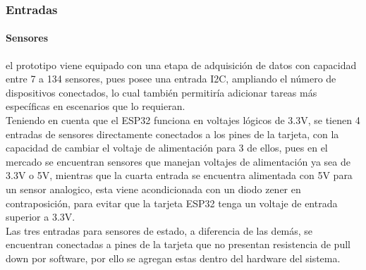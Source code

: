 	
	\subsubsection{Entradas}
	\paragraph{Sensores}
		el prototipo viene equipado con una etapa de adquisición de datos con capacidad entre 7 a 134 sensores, pues posee una entrada I2C, ampliando el número de dispositivos conectados, lo cual también permitiría adicionar tareas más específicas en escenarios que lo requieran.\\
		
	 	Teniendo en cuenta que el ESP32 funciona en voltajes lógicos de 3.3V, se tienen 4 entradas de sensores directamente conectados a los pines de la tarjeta, con la capacidad de cambiar el voltaje de alimentación para 3 de ellos, pues en el mercado se encuentran sensores que manejan voltajes de alimentación ya sea de 3.3V o 5V, mientras que la cuarta entrada se encuentra alimentada con 5V para un sensor analogico, esta viene acondicionada con un diodo zener en contraposición, para evitar que la tarjeta ESP32 tenga un voltaje de entrada superior a 3.3V.\\
		
		Las tres entradas para sensores de estado, a diferencia de las demás, se encuentran conectadas a pines de la tarjeta que no presentan resistencia de pull down por software, por ello se agregan estas dentro del hardware del sistema.\\
		
%	
%	
	
